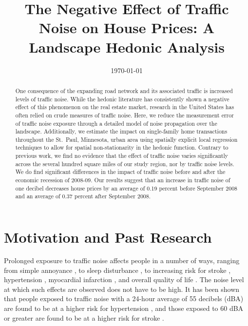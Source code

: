 \documentclass{article}\usepackage{graphicx, color}
\title{The Negative Effect of Traffic Noise on House Prices: A Landscape Hedonic Analysis}
\date{\today}
\begin{document}
\maketitle
\begin{singlespace}
\begin{abstract}
One consequence of the expanding road network and its associated traffic is increased levels of traffic noise.  While the hedonic literature has consistently shown a negative effect of this phenomenon on the real estate market, research in the United States has often relied on crude measures of traffic noise. Here, we reduce the measurement error of traffic noise exposure through a detailed model of noise propagation over the landscape. Additionally, we estimate the impact on single-family home transactions throughout the St.\ Paul, Minnesota, urban area using spatially explicit local regression techniques to allow for spatial non-stationarity in the hedonic function. Contrary to previous work, we find no evidence that the effect of traffic noise varies significantly across the several hundred square miles of our study region, nor by traffic noise levels. We do find significant differences in the impact of traffic noise before and after the economic recession of 2008-09. Our results suggest that an increase in traffic noise of one decibel decreases house prices by an average of 0.19 percent before September 2008 and an average of 0.37 percent after September 2008.
\end{abstract}
\end{singlespace}

\newpage
\section{Motivation and Past Research}\label{sec:lit}
Prolonged exposure to traffic noise affects people in a number of ways, ranging from simple annoyance \citep{Miedema2001, Ouis2001, Ohrstrom2007, DeKluizenaar2013, Weinhold2013}, to sleep disturbance , to increasing risk for stroke \citep{Sorensen2011}, hypertension \citep{Jarup2008, Bodin2009}, myocardial infarction \citep{Babisch2005}, and overall quality of life \citep{Shepherd2013}. The noise level at which such effects are observed does not have to be high.  It has been shown that people exposed to traffic noise with a 24-hour average of 55 decibels (dBA) are found to be at a higher risk for hypertension \citep{Barregard2009, Bodin2009}, and those exposed to 60 dBA or greater are found to be at a higher risk for stroke \citep{Sorensen2011}.  
\end{document}
